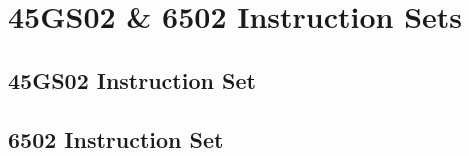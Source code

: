 \chapter{45GS02 \& 6502 Instruction Sets}

\section{45GS02 Instruction Set}



\section{6502 Instruction Set}



